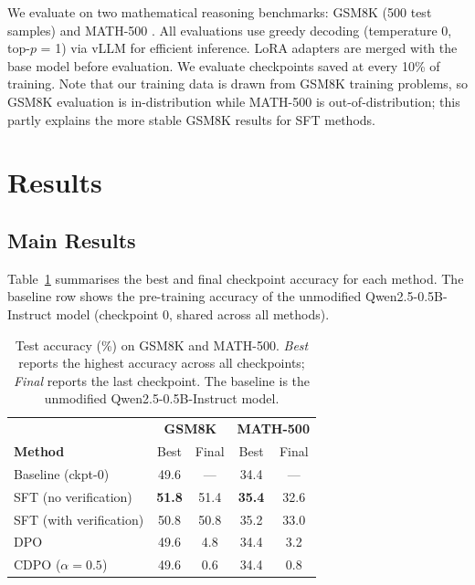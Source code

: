 \documentclass[11pt]{article}
\begin{document}
We evaluate on two mathematical reasoning benchmarks: GSM8K \autocite{cobbe2021training} (500 test samples) and MATH-500 \autocite{hendrycks2021measuring}. All evaluations use greedy decoding (temperature 0, top-$p$ = 1) via vLLM for efficient inference. LoRA adapters are merged with the base model before evaluation. We evaluate checkpoints saved at every 10\% of training. Note that our training data is drawn from GSM8K training problems, so GSM8K evaluation is in-distribution while MATH-500 is out-of-distribution; this partly explains the more stable GSM8K results for SFT methods.

\section{Results}
\label{sec:results}

\subsection{Main Results}

Table~\ref{tab:main_results} summarises the best and final checkpoint accuracy for each method. The baseline row shows the pre-training accuracy of the unmodified Qwen2.5-0.5B-Instruct model (checkpoint 0, shared across all methods).

\begin{table}[H]
    \centering
    \renewcommand{\arraystretch}{1.2}
    \caption{Test accuracy (\%) on GSM8K and MATH-500. \textit{Best} reports the highest accuracy across all checkpoints; \textit{Final} reports the last checkpoint. The baseline is the unmodified Qwen2.5-0.5B-Instruct model.}
    \label{tab:main_results}
    \begin{tabular}{lcccc}
        \hline
                                & \multicolumn{2}{c}{\textbf{GSM8K}} & \multicolumn{2}{c}{\textbf{MATH-500}}                         \\
        \textbf{Method}         & Best                               & Final                                 & Best          & Final \\
        \hline
        Baseline (ckpt-0)       & 49.6                               & ---                                   & 34.4          & ---   \\
        SFT (no verification)   & \textbf{51.8}                      & 51.4                                  & \textbf{35.4} & 32.6  \\
        SFT (with verification) & 50.8                               & 50.8                                  & 35.2          & 33.0  \\
        DPO                     & 49.6                               & 4.8                                   & 34.4          & 3.2   \\
        CDPO ($\alpha\!=\!0.5$) & 49.6                               & 0.6                                   & 34.4          & 0.8   \\
        \hline
    \end{tabular}
\end{table}
\end{document}
